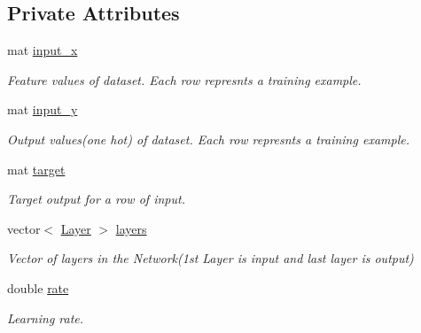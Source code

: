 \subsection*{Private Attributes}
\begin{DoxyCompactItemize}
\item 
\mbox{\label{classNeuralNetwork_a2ecd9a7dc7ad526ab1518c457f8b16fa}} 
mat \hyperlink{classNeuralNetwork_a2ecd9a7dc7ad526ab1518c457f8b16fa}{input\+\_\+x}
\begin{DoxyCompactList}\small\item\em Feature values of dataset. Each row represnts a training example. \end{DoxyCompactList}\item 
\mbox{\label{classNeuralNetwork_a29b1c821b70b19179e055205d10b57dc}} 
mat \hyperlink{classNeuralNetwork_a29b1c821b70b19179e055205d10b57dc}{input\+\_\+y}
\begin{DoxyCompactList}\small\item\em Output values(one hot) of dataset. Each row represnts a training example. \end{DoxyCompactList}\item 
\mbox{\label{classNeuralNetwork_a93208b94c9b084edc76ccaf8ac7e591f}} 
mat \hyperlink{classNeuralNetwork_a93208b94c9b084edc76ccaf8ac7e591f}{target}
\begin{DoxyCompactList}\small\item\em Target output for a row of input. \end{DoxyCompactList}\item 
\mbox{\label{classNeuralNetwork_a064623c710a18b6736aa799fca74fd82}} 
vector$<$ \hyperlink{classLayer}{Layer} $>$ \hyperlink{classNeuralNetwork_a064623c710a18b6736aa799fca74fd82}{layers}
\begin{DoxyCompactList}\small\item\em Vector of layers in the Network(1st Layer is input and last layer is output) \end{DoxyCompactList}\item 
\mbox{\label{classNeuralNetwork_a32cddadde136ac9c43b7b738c33c9c2b}} 
double \hyperlink{classNeuralNetwork_a32cddadde136ac9c43b7b738c33c9c2b}{rate}
\begin{DoxyCompactList}\small\item\em Learning rate. \end{DoxyCompactList}\item 

\end{DoxyCompactItemize}

